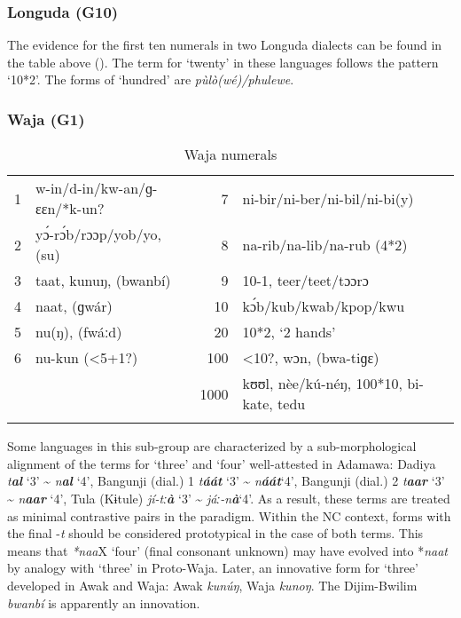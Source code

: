 \subsubsection{Longuda (G10)}%
The evidence for the first ten numerals in two Longuda dialects can be found in the table above (). The term for ‘twenty’ in these languages follows the pattern ‘10*2’.  The forms of ‘hundred’ are \textit{p{\`{u}}lò(wé)/phulewe}.

\subsubsection{Waja (G1)}%
\begin{table}
\caption{\label{tab:3:114}Waja numerals}


\begin{tabularx}{\textwidth}{llrX}
\lsptoprule

1 & w-in/d-in/kw-an/ɡ-ɛɛn/*k-un? & 7 & ni-bir/ni-ber/ni-bil/ni-bi(y)\\
2 & y{\'{ɔ}}-r{\'{ɔ}}b/rɔɔp/yob/yo, (su) & 8 & na-rib/na-lib/na-rub (4*2)\\
3 & taat, kunuŋ, (bwanbí) & 9 & 10-1, teer/teet/tɔɔrɔ\\
4 & naat, (ɡwár) & 10 & k{\'{ɔ}}b/kub/kwab/kpop/kwu\\
5 & nu(ŋ), (fwáːd) & 20 & 10*2, `2 hands'\\
6 & nu-kun (<5+1?) & 100 & <10?, wɔn, (bwa-tiɡɛ)\\
&  & 1000 & kʊʊl, nèe/k{\'{u}}-néŋ, 100*10, bi-kate, tedu\\
\lspbottomrule
\end{tabularx}
\end{table}

Some languages in this sub-group are characterized by a sub-morphological alignment of the terms for ‘three’ and ‘four’ well-attested in Adamawa: Dadiya \textit{t}\textbf{\textit{al} }‘3’ {\textasciitilde} \textit{n}\textbf{\textit{al}} ‘4’, Bangunji (dial.) 1 \textit{t}\textbf{\textit{áát}} ‘3’ {\textasciitilde} \textit{n}\textbf{\textit{áát}}‘4’, Bangunji (dial.) 2 \textit{t}\textbf{\textit{aar}} ‘3’ {\textasciitilde} \textit{n}\textbf{\textit{aar}} ‘4’, Tula (Kɨtule) \textit{jí-tː}\textbf{\textit{à}} ‘3’ {\textasciitilde} \textit{jáː-n}\textbf{\textit{à}}‘4’. As a result, these terms are treated as minimal contrastive pairs in the paradigm.  Within the NC context, forms with the final -\textit{t} should be considered prototypical in the case of both terms. This means that \textit{*naa}X ‘four’ (final consonant unknown) may have evolved into *\textit{naat} by analogy with ‘three’ in Proto-Waja. Later, an innovative form for ‘three’ developed in Awak and Waja: Awak \textit{kun{\'{u}}ŋ}, Waja \textit{kunoŋ}. The Dijim-Bwilim \textit{bwanbí} is apparently an innovation. 

